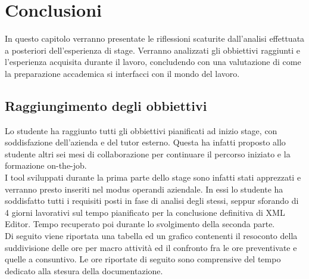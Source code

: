 
\chapter{Conclusioni}
\label{cap:conclusioni}

In questo capitolo verranno presentate le riflessioni scaturite dall'analisi effettuata a posteriori dell'esperienza di stage. Verranno analizzati gli obbiettivi raggiunti e l'esperienza acquisita durante il lavoro, concludendo con una valutazione di come la preparazione accademica si interfacci con il mondo del lavoro.

\section{Raggiungimento degli obbiettivi}

Lo studente ha raggiunto tutti gli obbiettivi pianificati ad inizio stage, con soddisfazione dell'azienda e del tutor esterno. Questa ha infatti proposto allo studente altri sei mesi di collaborazione per continuare il percorso iniziato e la formazione on-the-job.\\

I tool sviluppati durante la prima parte dello stage sono infatti stati apprezzati e verranno presto inseriti nel modus operandi aziendale. In essi lo studente ha soddisfatto tutti i requisiti posti in fase di analisi degli stessi, seppur sforando di 4 giorni lavorativi sul tempo pianificato per la conclusione definitiva di XML Editor. Tempo recuperato poi durante lo svolgimento della seconda parte.\\

Di seguito viene riportata una tabella ed un grafico contenenti il resoconto della suddivisione delle ore per macro attività ed il confronto fra le ore preventivate e quelle a consuntivo. Le ore riportate di seguito sono comprensive del tempo dedicato alla stesura della documentazione.

